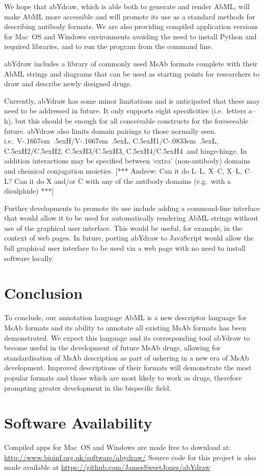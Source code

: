 \documentclass[a4paper]{article}
\newcommand{\VH}{\mbox{V\kern-.1667em \lower.5ex\hbox{\scriptsize H}}}
\newcommand{\VL}{\mbox{V\kern-.1667em \lower.5ex\hbox{\scriptsize L}}}
\newcommand{\VHVL}{\mbox{\VH/\VL}}
\newcommand{\CH}[1]{\mbox{C\lower.5ex\hbox{\scriptsize H}#1}}
\newcommand{\CL}{\mbox{C\kern-.0833em \lower.5ex\hbox{\scriptsize L}}}
\newcommand{\andrew}[1]{{\color{red} [*** Andrew: #1 ***]}}
\begin{document}
We hope that abYdraw, which is able both to generate and render AbML,
will make AbML more accessible and will promote its use as a standard
methods for describing antibody formats.  We are also providing
compiled application versions for Mac~OS and Windows environments
avoiding the need to install Python and required libraries, and to run
the program from the command line.

abYdraw includes a library of commonly used MsAb formats complete with their AbML
strings and diagrams that can be used as starting points for
researchers to draw and describe newly designed drugs.

Currently, abYdraw has some minor limitations and is anticipated that
these may need to be addressed in future. It only supports eight
specificities (i.e.\ letters a--h), but this should be enough for all
conceivable constructs for the foreseeable future.  abYdraw also
limits domain pairings to those normally seen. i.e.\ \VHVL,
\CH{1}/\CL, \CH{2}/\CH{2}, \CH{3}/\CH{3}, \CH{4}/\CH{4}\ and
hinge-hinge. In addition interactions may be specified between `extra'
(non-antibody) domains and chemical conjugation moieties.  \andrew{Can
  it do L--L, X--C, X--L, C--L? Can it do X and/or C with any of the
  antibody domains (e.g.\ with a disulphide)}

Further developments to promote its use include adding a command-line
interface that would allow it to be used for automatically rendering
AbML strings without use of the graphical user interface. This would
be useful, for example, in the context of web pages. In future,
porting abYdraw to JavaScript would allow the full graphical user
interface to be used via a web page with no need to install software
locally.


\section{Conclusion}

To conclude, our annotation language AbML is a new descriptor language
for MsAb formats and its ability to annotate all existing MsAb formats
has been demonstrated. We expect this language and its corresponding
tool abYdraw to become useful in the development of future MsAb drugs,
allowing for standardisation of MsAb description as part of ushering
in a new era of MsAb development. Improved descriptions of their
formats will demonstrate the most popular formats and those which are
most likely to work as drugs, therefore prompting greater development
in the bispecific field.  

\section{Software Availability}
Compiled apps for Mac~OS and Windows are made free to download at:
\url{http://www.bioinf.org.uk/software/abydraw/}
Source code for this project is also made available at
\url{https://github.com/JamesSweetJones/abYdraw}

 
\end{document}

